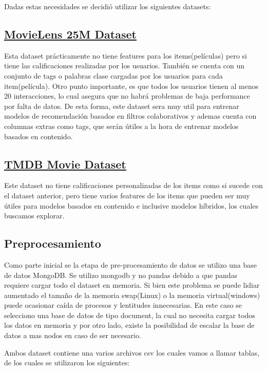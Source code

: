 \documentclass[11pt,a4paper,twoside]{thesis}
\begin{document}
Dadas estas necesidades se decidió utilizar los siguientes datasets:


\subsection{\href{https://grouplens.org/datasets/movielens/25m/}{MovieLens 25M Dataset}}

Esta dataset prácticamente no tiene features para los items(películas) pero si tiene las calificaciones realizadas 
por los usuarios. También se cuenta con un conjunto de tags o palabras clase cargadas por los usuarios para cada 
item(película). Otro punto importante, es que todos los usuarios tienen al menos 20 interacciones, lo cual asegura
que no habrá problemas de baja performance por falta de datos. 
De esta forma, este dataset sera muy util para entrenar modelos de recomendación basados en filtros colaborativos
y ademas cuenta con columnas extras como tags, que serán útiles a la hora de entrenar modelos basados en contenido.


\subsection{\href{https://www.kaggle.com/datasets/rounakbanik/the-movies-dataset?select=movies_metadata.csv}{TMDB Movie Dataset}}


Este dataset no tiene calificaciones personalizadas de los items como si sucede con el dataset anterior, 
pero tiene varios features de los items que pueden ser muy útiles para modelos basados en contenido e inclusive
modelos híbridos, los cuales buscamos explorar.


\subsection{Preprocesamiento}

Como parte inicial se la etapa de pre-procesamiento de datos se utilizo una base de datos MongoDB. Se utilizo mongodb 
y no pandas debido a que pandas requiere cargar todo el dataset en memoria. Si bien este problema se puede lidiar 
aumentado el tamaño de la memoria swap(Linux) o la memoria virtual(windows) puede ocasionar caída de procesos y lentitudes 
innecesarias. En este caso se selecciono una base de datos de tipo document, la cual no necesita cargar todos los datos 
en memoria y por otro lado, existe la posibilidad de escalar la base de datos a mas nodos en caso de ser necesario.


Ambos dataset contiene una varios archivos csv los cuales vamos a llamar tablas, de los cuales se utilizaron los siguientes:
\end{document}
